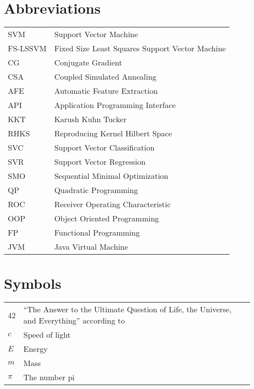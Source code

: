 \documentclass[master=mai,masteroption=ecs]{kulemt}
\begin{document}
\section*{Abbreviations}
\begin{flushleft}
  \renewcommand{\arraystretch}{1.1}
  \begin{tabularx}{\textwidth}{@{}p{12mm}X@{}}
    SVM   & Support Vector Machine \\
    FS-LSSVM   & Fixed Size Least Squares Support Vector Machine \\
    CG   & Conjugate Gradient \\
    CSA  & Coupled Simulated Annealing \\
    AFE  & Automatic Feature Extraction \\
    API  & Application Programming Interface \\ 
    KKT  & Karush Kuhn Tucker \\
    RHKS & Reproducing Kernel Hilbert Space\\
    SVC & Support Vector Classification\\
    SVR & Support Vector Regression\\
    SMO & Sequential Minimal Optimization\\
    QP & Quadratic Programming\\
    ROC & Receiver Operating Characteristic\\
    OOP & Object Oriented Programming\\
    FP & Functional Programming\\
    JVM & Java Virtual Machine\\
  \end{tabularx}
\end{flushleft}
\section*{Symbols}
\begin{flushleft}
  \renewcommand{\arraystretch}{1.1}
  \begin{tabularx}{\textwidth}{@{}p{12mm}X@{}}
    42    & ``The Answer to the Ultimate Question of Life, the Universe,
            and Everything'' according to \cite{h2g2} \\
    $c$   & Speed of light \\
    $E$   & Energy \\
    $m$   & Mass \\
    $\pi$ & The number pi \\
  \end{tabularx}
\end{flushleft}

\mainmatter








\appendixpage*          %
\appendix

\backmatter


\end{document}
